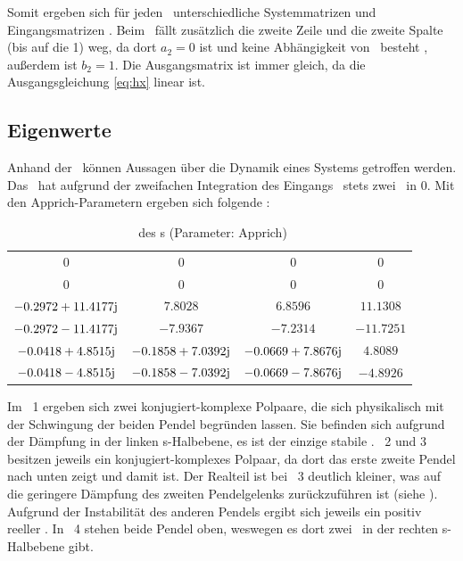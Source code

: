 Somit ergeben sich für jeden \ap\ unterschiedliche Systemmatrizen  und Eingangsmatrizen . Beim \bss\ fällt zusätzlich die zweite Zeile und die zweite Spalte (bis auf die 1) weg, da dort $a_2=0$ ist und keine Abhängigkeit von \xop\ besteht , außerdem ist $b_2=1$.
Die Ausgangsmatrix  ist immer gleich, da die Ausgangsgleichung \eqref{eq:hx} linear ist.


\subsection{Eigenwerte}

Anhand der \ewe\ können Aussagen über die Dynamik eines Systems getroffen werden. 
Das \bss\ hat aufgrund der zweifachen Integration des Eingangs \xopp\ stets zwei \ewe\ in 0. 
Mit den Apprich-Parametern ergeben sich folgende \ewe:

\begin{table}[htbp]
	\centering
	\caption{\ewe\ des \bss s (Parameter: Apprich)}
		\begin{tabular}[t]{cccc}
			\toprule
			\ape & \apz & \apd & \apv \\
			\midrule
			$0$	&	$0$	&	$0$	&	$0$	\\
			$0$	&	$0$	&	$0$	&	$0$	\\
			$-0.2972 +11.4177\mathrm{j}$ &    $7.8028						$	&	  $6.8596							$	&   $11.1308$	\\
			$-0.2972 -11.4177\mathrm{j}$ &   $-7.9367						$	&   $-7.2314					$		&  $-11.7251$	\\
			$-0.0418 + 4.8515\mathrm{j}$ &   $-0.1858 + 7.0392\mathrm{j}$	&  $-0.0669 + 7.8676\mathrm{j}$	&  $  4.8089$	\\
			$-0.0418 - 4.8515\mathrm{j}$ &   $-0.1858 - 7.0392\mathrm{j}$	& $ -0.0669 - 7.8676\mathrm{j}	$	&  $ -4.8926$	\\
			\bottomrule
		\end{tabular}
	\label{tab:ewappr}
\end{table}
Im \ap\ 1 ergeben sich zwei konjugiert-komplexe Polpaare, die sich physikalisch mit der Schwingung der beiden Pendel begründen lassen. Sie befinden sich aufgrund der Dämpfung in der linken s-Halbebene, es ist der einzige stabile \ap. \ap\ 2 und 3 besitzen jeweils ein konjugiert-komplexes Polpaar, da dort das erste \bzw zweite Pendel nach unten zeigt und damit  ist. Der Realteil ist bei \ap\ 3 deutlich kleiner, was auf die geringere Dämpfung des zweiten Pendelgelenks zurückzuführen ist (siehe ). Aufgrund der Instabilität des anderen Pendels ergibt sich jeweils ein positiv reeller \ew. In \ap\ 4 stehen beide Pendel oben, weswegen es dort zwei \ewe\ in der rechten s-Halbebene gibt.

